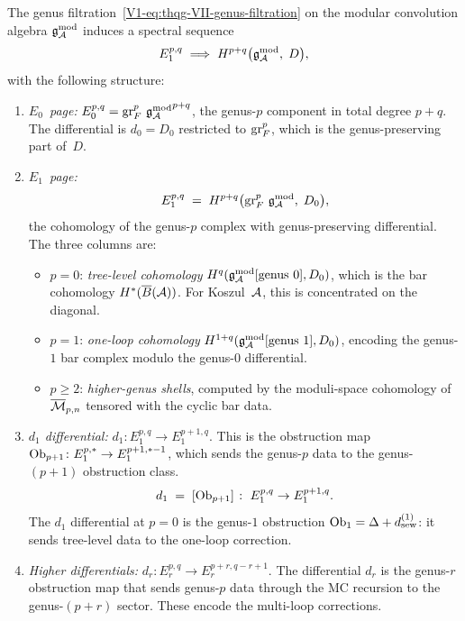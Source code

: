 \begin{theorem}
\label{thm:thqg-VII-genus-ss}
The genus filtration~\eqref{V1-eq:thqg-VII-genus-filtration}
on the modular convolution algebra $\mathfrak{g}_{\mathcal{A}}^{\mathrm{mod}}$ induces a
spectral sequence
\begin{equation}%
E_1^{p,q}
\;\Longrightarrow\;
H^{p+q}\bigl(\gAmod,\; D\bigr),
\end{equation}
with the following structure:

\begin{enumerate}[label=\textup{(\roman*)}]
\item \emph{$E_0$~page:}
 $E_0^{p,q} = \operatorname{gr}^p_F\,{\mathfrak{g}_{\mathcal{A}}^{\mathrm{mod}}}^{p+q}$,
 the genus-$p$ component in total degree $p + q$.
 The differential is $d_0 = D_0$ restricted to
 $\operatorname{gr}^p_F$, which is the genus-preserving part of~$D$.

\item \emph{$E_1$~page:}
 \begin{equation}%
 E_1^{p,q}
 \;=\;
 H^{p+q}\bigl(\gr^p_F\,\gAmod,\; D_0\bigr),
 \end{equation}
 the cohomology of the genus-$p$ complex with
 genus-preserving differential. The three columns are:
 \begin{itemize}
 \item $p = 0$: \emph{tree-level cohomology}
 $H^q(\mathfrak{g}_{\mathcal{A}}^{\mathrm{mod}}[\text{genus }0], D_0)$, which is the
 bar cohomology $H^*(\overline{B}(\mathcal{A}))$. For Koszul~$\mathcal{A}$,
 this is concentrated on the diagonal.
 \item $p = 1$: \emph{one-loop cohomology}
 $H^{1+q}(\mathfrak{g}_{\mathcal{A}}^{\mathrm{mod}}[\text{genus }1], D_0)$, encoding
 the genus-$1$ bar complex modulo the genus-$0$
 differential.
 \item $p \geq 2$: \emph{higher-genus shells},
 computed by the moduli-space cohomology of
 $\overline{\mathcal{M}}_{p,n}$ tensored with the cyclic
 bar data.
 \end{itemize}

\item \emph{$d_1$ differential:}
 $d_1 \colon E_1^{p,q} \to E_1^{p+1,q}$.
 This is the obstruction map
 $\mathrm{Ob}_{p+1} \colon E_1^{p,*} \to E_1^{p+1,*-1}$,
 which sends the genus-$p$ data to the genus-$(p{+}1)$
 obstruction class.
 \begin{equation}%
 d_1
 \;=\;
 [\Ob_{p+1}]
 \;\colon\;
 E_1^{p,q} \to E_1^{p+1,q}.
 \end{equation}
 The $d_1$ differential at $p = 0$ is the genus-$1$
 obstruction $\mathrm{Ob}_1 = \Delta + d_{\mathrm{sew}}^{(1)}$:
 it sends tree-level data to the one-loop correction.

\item \emph{Higher differentials:}
 $d_r \colon E_r^{p,q} \to E_r^{p+r,q-r+1}$.
 The differential $d_r$ is the genus-$r$ obstruction map
 that sends genus-$p$ data through the MC recursion to the
 genus-$(p{+}r)$ sector. These encode the multi-loop
 corrections.
\end{enumerate}
\end{theorem}

